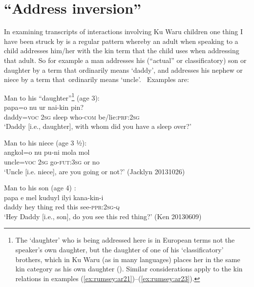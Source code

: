 \documentclass[output=paper]{langsci/langscibook}
\begin{document}
\section{“Address inversion”}\label{s:ar4}

In examining transcripts of interactions involving Ku Waru children one thing I have been struck by is a regular pattern whereby an adult when speaking to a child addresses him/her with the kin term that the child uses when addressing that adult. So for example a man addresses his (“actual” or classificatory) son or daughter by a term that ordinarily means ‘daddy’, and addresses his nephew or niece by a term that ordinarily means ‘uncle’.  Examples are:

\begin{exe}
	\ex Man to his “daughter”\footnote{The ‘daughter’ who is being addressed here is in European terms not the speaker’s own daughter, but the daughter of one of his ‘classificatory’ brothers, which in Ku Waru (as in many languages) places her in the same kin category as his own daughter (\citealt{Kroeber1909}). Similar considerations apply to the kin relations in examples  (\ref{ex:rumsey:ar21})--(\ref{ex:rumsey:ar23}).} (age 3):\label{ex:rumsey:ar20}\\
	\gll papa=o nu ur nai-kin pin?\\
	daddy=\textsc{voc} 2\textsc{sg}	sleep who-\textsc{com} be/lie:\textsc{prf}:2\textsc{sg}\\
	\trans ‘Daddy [i.e., daughter], with whom did you have a sleep over?’
\end{exe}

\begin{exe}
	\ex Man to his niece (age 3 ½):\label{ex:rumsey:ar21}\\
	\gll angkol=o nu pu-ni mola mol\\
	uncle=\textsc{voc} 2\textsc{sg} go-\textsc{fut}:3\textsc{sg} or no\\
	\trans ‘Uncle [i.e. niece], are you going or not?’ (Jacklyn 20131026)
\end{exe}

\begin{exe}
	\ex Man to his son	(age 4)	:\label{ex:rumsey:ar22}\\
	\gll papa e mel kuduyl ilyi kana-kin-i\\
	daddy hey thing red this see-\textsc{ppr}:2\textsc{sg}-\textsc{q}\\
	\trans ‘Hey Daddy [i.e., son], do you see this red thing?’ (Ken 20130609)
\end{exe}
\end{document}

